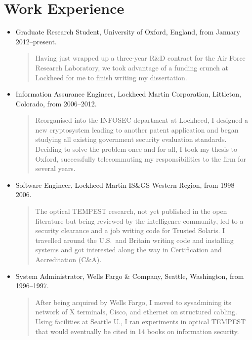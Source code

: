 \documentclass[letterpaper]{article}
\begin{document}
\section*{Work Experience} %

\begin{itemize}
	\item Graduate Research Student, University of Oxford, England, from January 2012--present.

		\begin{quote}\vspace{-2mm}
			Having just wrapped up a three-year R\&D contract for the Air Force Research
			Laboratory, we took advantage of a funding crunch at Lockheed for me to finish writing
			my dissertation.
		\end{quote}

	\item Information Assurance Engineer, Lockheed Martin Corporation, Littleton, Colorado, from
		2006--2012.

		\begin{quote}\vspace{-2mm}
			Reorganised into the INFOSEC department at Lockheed, I designed a new cryptosystem
			leading to another patent application and began studying all existing government
			security evaluation standards.  Deciding to solve the problem once and for all, I
			took my thesis to Oxford, successfully telecommuting my responsibilities to the firm
			for several years.
		\end{quote}

	\item Software Engineer, Lockheed Martin IS\&GS Western Region, from 1998--2006.

		\begin{quote}\vspace{-2mm}
			The optical TEMPEST research, not yet published in the open literature but being
			reviewed by the intelligence community, led to a security clearance and a job writing
			code for Trusted Solaris.  I travelled around the U.S.\ and Britain writing code and
			installing systems and got interested along the way in Certification and
			Accreditation (C\&A).
		\end{quote}

	\item System Administrator, Wells Fargo \& Company, Seattle, Washington, from  1996--1997.

		\begin{quote}\vspace{-2mm}
			After being acquired by Wells Fargo, I moved to sysadmining its network
			of X terminals, Cisco, and ethernet on structured cabling.  Using facilities
			at Seattle U., I ran experiments in optical TEMPEST that would eventually
			be cited in 14 books on information security.
		\end{quote}


\end{itemize}
\end{document}
